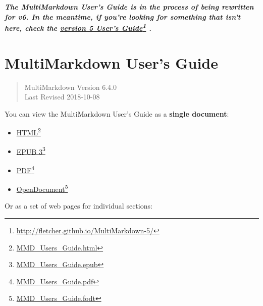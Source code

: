 
\def\mytitle{MultiMarkdown User's Guide}
\def\myauthor{Fletcher T. Penney}
\def\version{6.4.0}
\def\revised{2018-10-08}




\textbf{\emph{The MultiMarkdown User's Guide is in the process of being rewritten for v6. In the meantime, if you're looking for something that isn't here, check the \href{http://fletcher.github.io/MultiMarkdown-5/}{version 5 User's Guide}\footnote{\href{http://fletcher.github.io/MultiMarkdown-5/}{http:\slash \slash fletcher.github.io\slash MultiMarkdown-5\slash }} .}}

\chapter{MultiMarkdown User's Guide}
\label{title}

\begin{quote}
MultiMarkdown Version 6.4.0\\
Last Revised 2018-10-08
\end{quote}

You can view the MultiMarkdown User's Guide as a \textbf{single document}:

\begin{itemize}
\item \href{MMD_Users_Guide.html}{HTML}\footnote{\href{MMD_Users_Guide.html}{MMD\_Users\_Guide.html}}

\item \href{MMD_Users_Guide.epub}{EPUB 3}\footnote{\href{MMD_Users_Guide.epub}{MMD\_Users\_Guide.epub}}

\item \href{MMD_Users_Guide.pdf}{PDF}\footnote{\href{MMD_Users_Guide.pdf}{MMD\_Users\_Guide.pdf}}

\item \href{MMD_Users_Guide.fodt}{OpenDocument}\footnote{\href{MMD_Users_Guide.fodt}{MMD\_Users\_Guide.fodt}}

\end{itemize}

Or as a set of web pages for individual sections:

